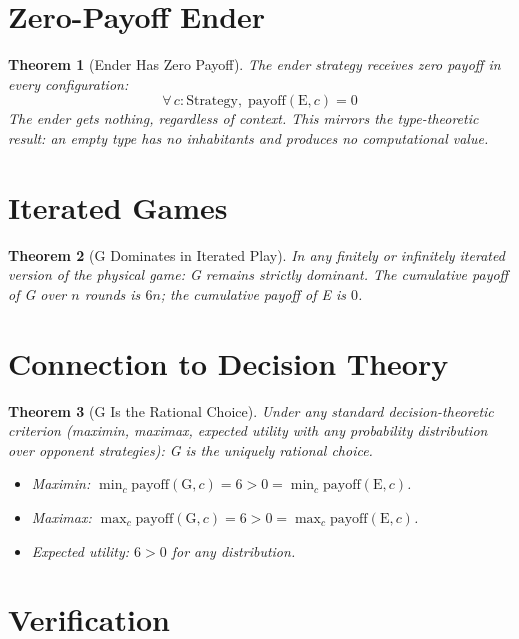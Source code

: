 \documentclass[12pt,a4paper]{article}
\newtheorem{theorem}{Theorem}[section]
\begin{document}
\section{Zero-Payoff Ender}

\begin{theorem}[Ender Has Zero Payoff]\label{thm:zero}
The ender strategy receives zero payoff in every configuration:
\[
\forall\, c : \text{Strategy},\; \text{payoff}(\text{E}, c) = 0
\]
The ender gets nothing, regardless of context. This mirrors the
type-theoretic result: an empty type has no inhabitants and
produces no computational value.
\end{theorem}

\section{Iterated Games}

\begin{theorem}[G Dominates in Iterated Play]\label{thm:iterated}
In any finitely or infinitely iterated version of the physical game:
G remains strictly dominant. The cumulative payoff of G over $n$ rounds
is $6n$; the cumulative payoff of E is $0$.
\end{theorem}

\section{Connection to Decision Theory}

\begin{theorem}[G Is the Rational Choice]\label{thm:rational}
Under any standard decision-theoretic criterion (maximin, maximax,
expected utility with any probability distribution over opponent strategies):
G is the uniquely rational choice.
\begin{itemize}
    \item Maximin: $\min_c \text{payoff}(\text{G}, c) = 6 > 0 = \min_c \text{payoff}(\text{E}, c)$.
    \item Maximax: $\max_c \text{payoff}(\text{G}, c) = 6 > 0 = \max_c \text{payoff}(\text{E}, c)$.
    \item Expected utility: $6 > 0$ for any distribution.
\end{itemize}
\end{theorem}

\section{Verification}
\end{document}
